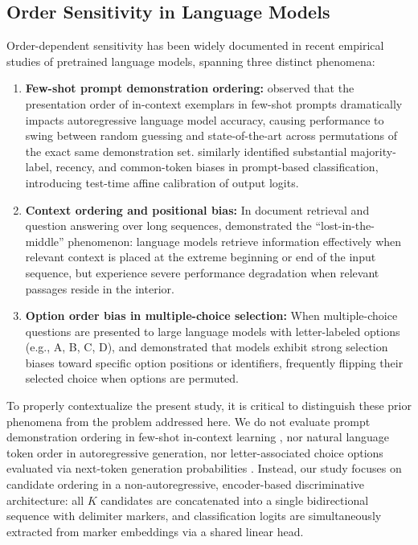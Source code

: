 \documentclass[11pt,a4paper]{article}
\begin{document}
\subsection{Order Sensitivity in Language Models}
Order-dependent sensitivity has been widely documented in recent empirical studies of pretrained language models, spanning three distinct phenomena:
\begin{enumerate}
    \item \textbf{Few-shot prompt demonstration ordering:} \citet{lu2022fantastically} observed that the presentation order of in-context exemplars in few-shot prompts dramatically impacts autoregressive language model accuracy, causing performance to swing between random guessing and state-of-the-art across permutations of the exact same demonstration set. \citet{zhao2021calibrate} similarly identified substantial majority-label, recency, and common-token biases in prompt-based classification, introducing test-time affine calibration of output logits.
    \item \textbf{Context ordering and positional bias:} In document retrieval and question answering over long sequences, \citet{liu2024lost} demonstrated the ``lost-in-the-middle'' phenomenon: language models retrieve information effectively when relevant context is placed at the extreme beginning or end of the input sequence, but experience severe performance degradation when relevant passages reside in the interior.
    \item \textbf{Option order bias in multiple-choice selection:} When multiple-choice questions are presented to large language models with letter-labeled options (e.g., A, B, C, D), \citet{pezeshkpour2024large} and \citet{zheng2024large} demonstrated that models exhibit strong selection biases toward specific option positions or identifiers, frequently flipping their selected choice when options are permuted.
\end{enumerate}

To properly contextualize the present study, it is critical to distinguish these prior phenomena from the problem addressed here. We do not evaluate prompt demonstration ordering in few-shot in-context learning \citep{lu2022fantastically}, nor natural language token order in autoregressive generation, nor letter-associated choice options evaluated via next-token generation probabilities \citep{pezeshkpour2024large, zheng2024large}. Instead, our study focuses on candidate ordering in a non-autoregressive, encoder-based discriminative architecture: all $K$ candidates are concatenated into a single bidirectional sequence with delimiter markers, and classification logits are simultaneously extracted from marker embeddings via a shared linear head.
\end{document}
